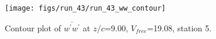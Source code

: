 \begin{figure}[H]
\centering
\texttt{[image: figs/run\_43/run\_43\_ww\_contour]}
\caption{Contour plot of $\overline{w^\prime w^\prime}$ at $z/c$=9.00, $V_{free}$=19.08, station 5.}
\label{fig:run_43_ww_contour}
\end{figure}



